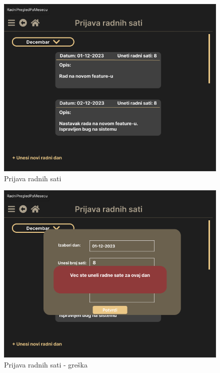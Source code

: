 \documentclass[a4paper]{article}
\begin{document}
\begin{figure} [!ht]
    \begin{center}
        \includegraphics[scale=0.25]{UI/Zaposleni/RadniSati.png}
    \end{center}
\caption{Prijava radnih sati}
\end{figure}

\begin{figure} [!ht]
    \begin{center}
        \includegraphics[scale=0.25]{UI/Zaposleni/RadniSatiErrorInput.png}
    \end{center}
\caption{Prijava radnih sati - greška}
\end{figure}
\end{document}
